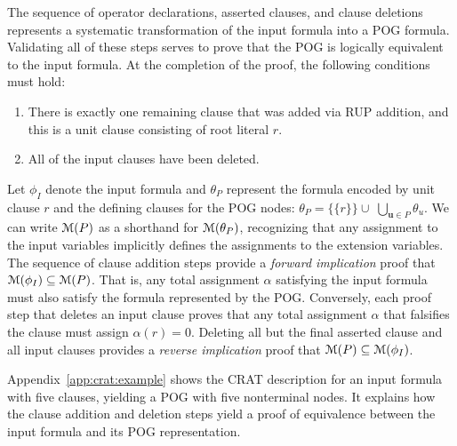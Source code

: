 \documentclass[letterpaper,USenglish,cleveref, autoref, thm-restate]{lipics-v2021}
\newcommand{\assign}{\alpha}
\newcommand{\modelset}{{\cal M}}
\newcommand{\inputformula}{\phi_I}
\newcommand{\pogformula}{\theta_P}
\newcommand{\makenode}[1]{\mathbf{#1}}
\newcommand{\nodeu}{\makenode{u}}
\begin{document}

The sequence of operator declarations, asserted clauses, and
clause deletions represents a systematic transformation of the input formula
into a POG formula.  Validating all of these steps serves to prove that the
POG is logically equivalent to the input formula.
At the completion of the proof, the following conditions must hold:
\begin{enumerate}
\item There is exactly one remaining clause that was added via RUP
  addition, and this is a unit clause consisting of root literal $r$.
\item All of the input clauses have been deleted.
\end{enumerate}
Let $\inputformula$ denote the input formula and $\pogformula$ represent the formula encoded by unit clause $r$ and the defining clauses for the POG nodes:
$\pogformula = \{\{r\}\} \cup \; \bigcup_{\nodeu \in P} \theta_{u}$.  We can write $\modelset(P)$ as a shorthand for $\modelset(\pogformula)$, recognizing that
any assignment to the input variables implicitly defines the assignments to the extension variables.
The sequence of clause addition steps provide a {\em forward implication} proof that
$\modelset(\inputformula) \subseteq \modelset(P)$.  That is, any total
assignment $\assign$ satisfying the input formula must also satisfy
the formula represented by the POG\@.
Conversely,
each proof step that deletes an input clause proves that any
total assignment $\alpha$ that falsifies the clause must
assign $\assign(r) = 0$.  Deleting all but the final asserted clause and all input clauses provides a {\em reverse implication} proof
that
$\modelset(P) \subseteq \modelset(\inputformula)$.

Appendix~\ref{app:crat:example} shows the CRAT description for
an input formula with five clauses, yielding a POG with five
nonterminal nodes.  It explains how the clause addition and deletion
steps yield a proof of equivalence between the input formula and its POG
representation.
\end{document}
